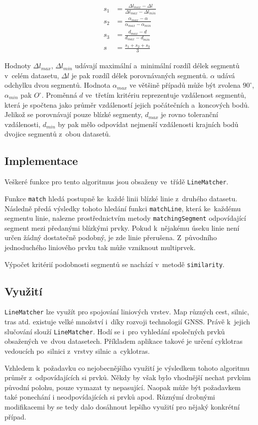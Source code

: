 \begin{equation}
 \begin{aligned}
 s_1 &= \frac{ \Delta l_{max} - \Delta l }{ \Delta l_{max} - \Delta l_{min}} \\ 
 s_2 &= \frac{ \alpha_{max} - \alpha }{ \alpha_{max} - \alpha_{min}} \\ 
 s_3 &= \frac{ d_{max} - d }{ d_{max} - d_{min}} \\ 
 s &= \frac{s_1+s_2+s_3}{3}
 \label{crit}
 \end{aligned}
\end{equation}

Hodnoty $\Delta l_{max}$, $\Delta l_{min}$ udávají maximální a~minimální rozdíl délek
segmentů v~celém datasetu, $\Delta l$ je pak rozdíl délek porovnávaných segmentů.
$\alpha$ udává odchylku dvou segmentů. Hodnota $\alpha_{max}$ ve většině případů může
být zvolena $90^{\circ}$, $\alpha_{min}$ pak $O^\circ$. Proměnná $d$ ve~třetím 
kritériu reprezentuje vzdálenost segmentů, která je spočtena jako průměr vzdáleností
jejich počátečních a~koncových bodů. Jelikož se porovnávají pouze blízké segmenty,
$d_{max}$ je rovno toleranční vzdálenosti, $d_{min}$ by pak mělo odpovídat nejmenší
vzdálenosti krajních bodů dvojice segmentů z~obou datasetů.


\subsection{Implementace} %
\label{lm-implementace}
Veškeré funkce pro tento algoritmus jsou obsaženy ve~třídě \texttt{Line\-Matcher}.

Funkce \texttt{match} hledá postupně ke~každé linii blízké linie z~druhého datasetu.
Následně předá výsledky tohoto hledání funkci \texttt{match\-Line}, která ke~každému
segmentu linie, nalezne prostřednictvím metody \texttt{matching\-Segment} odpovídající
segment mezi předanými blízkými prvky. Pokud k~nějakému úseku linie není určen
žádný dostatečně podobný, je zde linie přerušena. Z~původního jednoduchého liniového
prvku tak může vzniknout multiprvek. 

Výpočet kritérií podobnosti segmentů se nachází v~metodě \texttt{similarity}. 

\subsection{Využití}
\label{lm-vyuziti}

\texttt{LineMatcher} lze využít pro spojování liniových vrstev. Map různých cest, 
silnic, tras atd. existuje velké množství i~díky rozvoji technologií GNSS. Právě
k~jejich slučování slouží \texttt{LineMatcher}. Hodí se i~pro vyhledání společných 
prvků obsažených ve~dvou datasetech. Příkladem aplikace takové je určení
cyklotras vedoucích po~silnici z~vrstvy silnic a~cyklotras. 

Vzhledem k~požadavku co nejobecnějšího využití je výsledkem tohoto algoritmu
průměr z~odpovídajících si prvků.  Někdy by však bylo vhodnější nechat prvkům
původní polohu, pouze vymazat ty nepasující. Naopak může být požadavkem také
ponechání i neodpovídajících si prvků apod. Různýmí drobnými modifikacemi
by se tedy dalo dosáhnout lepšího využití pro nějaký konkrétní případ.
